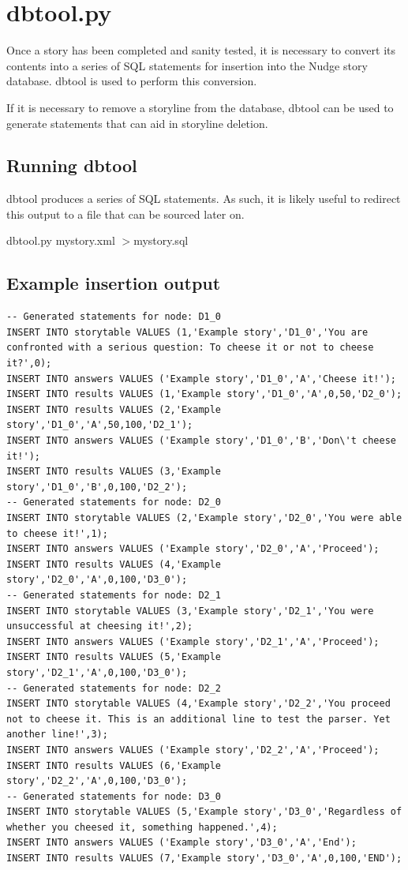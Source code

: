 \documentclass[12pt,letterpaper]{article}
\begin{document}
 \section{dbtool.py}
 Once a story has been completed and sanity tested, it is necessary to convert its contents into a series of 
 SQL statements for insertion into the Nudge story database. dbtool is used to perform this conversion.
 
 If it is necessary to remove a storyline from the database, dbtool can be used to generate statements that can aid in 
 storyline deletion.
 
 \subsection{Running dbtool}
 dbtool produces a series of SQL statements. As such, it is likely useful to redirect this output to a file that can 
 be sourced later on.
 
 \begin{center}
 dbtool.py mystory.xml $>$mystory.sql
 \end{center}
 
 \subsection{Example insertion output}
 \begin{lstlisting}[breaklines=true]
-- Generated statements for node: D1_0
INSERT INTO storytable VALUES (1,'Example story','D1_0','You are confronted with a serious question: To cheese it or not to cheese it?',0);
INSERT INTO answers VALUES ('Example story','D1_0','A','Cheese it!');
INSERT INTO results VALUES (1,'Example story','D1_0','A',0,50,'D2_0');
INSERT INTO results VALUES (2,'Example story','D1_0','A',50,100,'D2_1');
INSERT INTO answers VALUES ('Example story','D1_0','B','Don\'t cheese it!');
INSERT INTO results VALUES (3,'Example story','D1_0','B',0,100,'D2_2');
-- Generated statements for node: D2_0
INSERT INTO storytable VALUES (2,'Example story','D2_0','You were able to cheese it!',1);
INSERT INTO answers VALUES ('Example story','D2_0','A','Proceed');
INSERT INTO results VALUES (4,'Example story','D2_0','A',0,100,'D3_0');
-- Generated statements for node: D2_1
INSERT INTO storytable VALUES (3,'Example story','D2_1','You were unsuccessful at cheesing it!',2);
INSERT INTO answers VALUES ('Example story','D2_1','A','Proceed');
INSERT INTO results VALUES (5,'Example story','D2_1','A',0,100,'D3_0');
-- Generated statements for node: D2_2
INSERT INTO storytable VALUES (4,'Example story','D2_2','You proceed not to cheese it. This is an additional line to test the parser. Yet another line!',3);
INSERT INTO answers VALUES ('Example story','D2_2','A','Proceed');
INSERT INTO results VALUES (6,'Example story','D2_2','A',0,100,'D3_0');
-- Generated statements for node: D3_0
INSERT INTO storytable VALUES (5,'Example story','D3_0','Regardless of whether you cheesed it, something happened.',4);
INSERT INTO answers VALUES ('Example story','D3_0','A','End');
INSERT INTO results VALUES (7,'Example story','D3_0','A',0,100,'END');
 \end{lstlisting}
 
\end{document}

